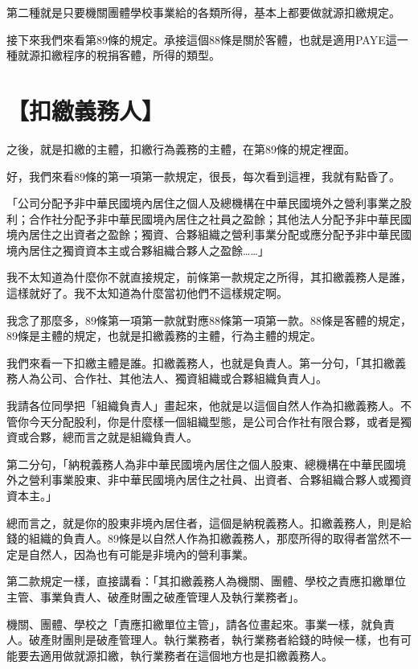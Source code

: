 \documentclass[]{ctexbook}
\begin{document}
第二種就是只要機關團體學校事業給的各類所得，基本上都要做就源扣繳規定。

接下來我們來看第89條的規定。承接這個88條是關於客體，也就是適用PAYE這一種就源扣繳程序的稅捐客體，所得的類型。

\hypertarget{ux6263ux7e73ux7fa9ux52d9ux4eba}{%
\section{【扣繳義務人】}\label{ux6263ux7e73ux7fa9ux52d9ux4eba}}

之後，就是扣繳的主體，扣繳行為義務的主體，在第89條的規定裡面。

好，我們來看89條的第一項第一款規定，很長，每次看到這裡，我就有點昏了。

「公司分配予非中華民國境內居住之個人及總機構在中華民國境外之營利事業之股利；合作社分配予非中華民國境內居住之社員之盈餘；其他法人分配予非中華民國境內居住之出資者之盈餘；獨資、合夥組織之營利事業分配或應分配予非中華民國境內居住之獨資資本主或合夥組織合夥人之盈餘\ldots\ldots」

我不太知道為什麼你不就直接規定，前條第一款規定之所得，其扣繳義務人是誰，這樣就好了。我不太知道為什麼當初他們不這樣規定啊。

我念了那麼多，89條第一項第一款就對應88條第一項第一款。88條是客體的規定，89條是主體的規定，也就是扣繳義務的主體，行為主體的規定。

我們來看一下扣繳主體是誰。扣繳義務人，也就是負責人。第一分句，「其扣繳義務人為公司、合作社、其他法人、獨資組織或合夥組織負責人」。

我請各位同學把「組織負責人」畫起來，他就是以這個自然人作為扣繳義務人。不管你今天分配股利，你是什麼樣一個組織型態，是公司合作社有限合夥，或者是獨資或合夥，總而言之就是組織負責人。

第二分句，「納稅義務人為非中華民國境內居住之個人股東、總機構在中華民國境外之營利事業股東、非中華民國境內居住之社員、出資者、合夥組織合夥人或獨資資本主。」

總而言之，就是你的股東非境內居住者，這個是納稅義務人。扣繳義務人，則是給錢的組織的負責人。89條是以自然人作為扣繳義務人，那麼所得的取得者當然不一定是自然人，因為也有可能是非境內的營利事業。

第二款規定一樣，直接講看：「其扣繳義務人為機關、團體、學校之責應扣繳單位主管、事業負責人、破產財團之破產管理人及執行業務者」。

機關、團體、學校之「責應扣繳單位主管」，請各位畫起來。事業一樣，就負責人。破產財團則是破產管理人。執行業務者，執行業務者給錢的時候一樣，也有可能要去適用做就源扣繳，執行業務者在這個地方也是扣繳義務人。
\end{document}

